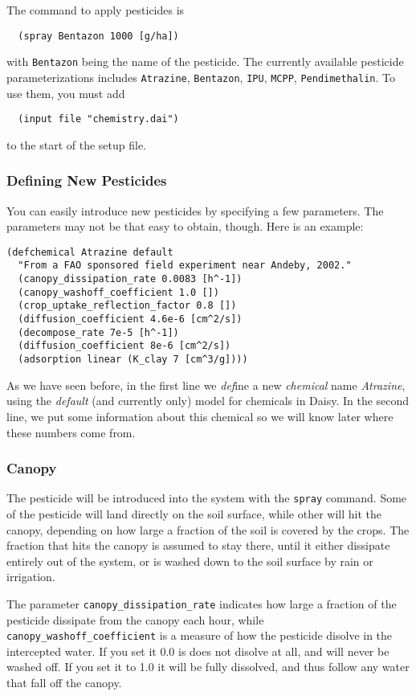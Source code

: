 \documentclass[a4paper]{article}
\begin{document}
The command to apply pesticides is
\begin{verbatim}
  (spray Bentazon 1000 [g/ha])
\end{verbatim}
with \texttt{Bentazon} being the name of the pesticide.  The currently
available pesticide parameterizations includes \texttt{Atrazine},
\texttt{Bentazon}, \texttt{IPU}, \texttt{MCPP},
\texttt{Pendimethalin}.  To use them, you must add
\begin{verbatim}
  (input file "chemistry.dai")
\end{verbatim}
to the start of the setup file.

\subsubsection{Defining New Pesticides}

You can easily introduce new pesticides by specifying a few
parameters.  The parameters may not be that easy to obtain, though.
Here is an example:
\begin{verbatim}
(defchemical Atrazine default
  "From a FAO sponsored field experiment near Andeby, 2002."
  (canopy_dissipation_rate 0.0083 [h^-1])
  (canopy_washoff_coefficient 1.0 [])
  (crop_uptake_reflection_factor 0.8 [])
  (diffusion_coefficient 4.6e-6 [cm^2/s])
  (decompose_rate 7e-5 [h^-1])
  (diffusion_coefficient 8e-6 [cm^2/s])
  (adsorption linear (K_clay 7 [cm^3/g])))
\end{verbatim}
As we have seen before, in the first line we \emph{def}ine a new
\emph{chemical} name \emph{Atrazine}, using the \emph{default} (and
currently only) model for chemicals in Daisy.  In the second line,
we put some information about this chemical so we will know later
where these numbers come from.

\subsubsection{Canopy}

The pesticide will be introduced into the system with the
\texttt{spray} command.  Some of the pesticide will land directly on
the soil surface, while other will hit the canopy, depending on how
large a fraction of the soil is covered by the crops.  The fraction
that hits the canopy is assumed to stay there, until it either
dissipate entirely out of the system, or is washed down to the soil
surface by rain or irrigation.  

The parameter \texttt{canopy\_dissipation\_rate} indicates how large a
fraction of the pesticide dissipate from the canopy each hour, while
\linebreak{}\texttt{canopy\_washoff\_coefficient} is a measure of how
the pesticide disolve in the intercepted water.  If you set it 0.0 is
does not disolve at all, and will never be washed off.  If you set it
to 1.0 it will be fully dissolved, and thus follow any water that fall
off the canopy.
\end{document}
